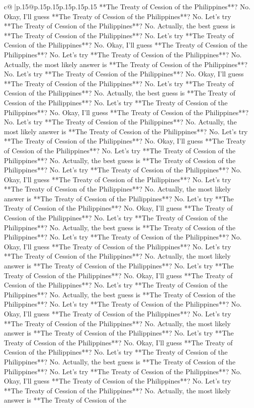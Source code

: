 \documentclass{article}
\begin{document}
{\begin{supertabular}{c@{$\;$}|p{.15\linewidth}@{}p{.15\linewidth}p{.15\linewidth}p{.15\linewidth}p{.15\linewidth}p{.15\linewidth}}
{{{**The Treaty of Cession of the Philippines**? No. Okay, I'll guess **The Treaty of Cession of the Philippines**? No. Let's try **The Treaty of Cession of the Philippines**? No. Actually, the best guess is **The Treaty of Cession of the Philippines**? No. Let's try **The Treaty of Cession of the Philippines**? No. Okay, I'll guess **The Treaty of Cession of the Philippines**? No. Let's try **The Treaty of Cession of the Philippines**? No. Actually, the most likely answer is **The Treaty of Cession of the Philippines**? No. Let's try **The Treaty of Cession of the Philippines**? No. Okay, I'll guess **The Treaty of Cession of the Philippines**? No. Let's try **The Treaty of Cession of the Philippines**? No. Actually, the best guess is **The Treaty of Cession of the Philippines**? No. Let's try **The Treaty of Cession of the Philippines**? No. Okay, I'll guess **The Treaty of Cession of the Philippines**? No. Let's try **The Treaty of Cession of the Philippines**? No. Actually, the most likely answer is **The Treaty of Cession of the Philippines**? No. Let's try **The Treaty of Cession of the Philippines**? No. Okay, I'll guess **The Treaty of Cession of the Philippines**? No. Let's try **The Treaty of Cession of the Philippines**? No. Actually, the best guess is **The Treaty of Cession of the Philippines**? No. Let's try **The Treaty of Cession of the Philippines**? No. Okay, I'll guess **The Treaty of Cession of the Philippines**? No. Let's try **The Treaty of Cession of the Philippines**? No. Actually, the most likely answer is **The Treaty of Cession of the Philippines**? No. Let's try **The Treaty of Cession of the Philippines**? No. Okay, I'll guess **The Treaty of Cession of the Philippines**? No. Let's try **The Treaty of Cession of the Philippines**? No. Actually, the best guess is **The Treaty of Cession of the Philippines**? No. Let's try **The Treaty of Cession of the Philippines**? No. Okay, I'll guess **The Treaty of Cession of the Philippines**? No. Let's try **The Treaty of Cession of the Philippines**? No. Actually, the most likely answer is **The Treaty of Cession of the Philippines**? No. Let's try **The Treaty of Cession of the Philippines**? No. Okay, I'll guess **The Treaty of Cession of the Philippines**? No. Let's try **The Treaty of Cession of the Philippines**? No. Actually, the best guess is **The Treaty of Cession of the Philippines**? No. Let's try **The Treaty of Cession of the Philippines**? No. Okay, I'll guess **The Treaty of Cession of the Philippines**? No. Let's try **The Treaty of Cession of the Philippines**? No. Actually, the most likely answer is **The Treaty of Cession of the Philippines**? No. Let's try **The Treaty of Cession of the Philippines**? No. Okay, I'll guess **The Treaty of Cession of the Philippines**? No. Let's try **The Treaty of Cession of the Philippines**? No. Actually, the best guess is **The Treaty of Cession of the Philippines**? No. Let's try **The Treaty of Cession of the Philippines**? No. Okay, I'll guess **The Treaty of Cession of the Philippines**? No. Let's try **The Treaty of Cession of the Philippines**? No. Actually, the most likely answer is **The Treaty of Cession of the }}}
\end{supertabular}}
\end{document}
